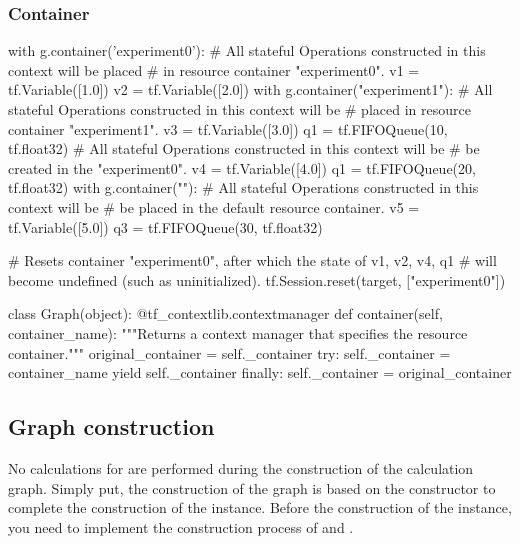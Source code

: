 \begin{content}
\subsubsection{Container}

\begin{leftbar}
\begin{python}
with g.container('experiment0'):
  # All stateful Operations constructed in this context will be placed
  # in resource container "experiment0".
  v1 = tf.Variable([1.0])
  v2 = tf.Variable([2.0])
  with g.container("experiment1"):
    # All stateful Operations constructed in this context will be
    # placed in resource container "experiment1".
    v3 = tf.Variable([3.0])
    q1 = tf.FIFOQueue(10, tf.float32)
  # All stateful Operations constructed in this context will be
  # be created in the "experiment0".
  v4 = tf.Variable([4.0])
  q1 = tf.FIFOQueue(20, tf.float32)
  with g.container(""):
    # All stateful Operations constructed in this context will be
    # be placed in the default resource container.
    v5 = tf.Variable([5.0])
    q3 = tf.FIFOQueue(30, tf.float32)

# Resets container "experiment0", after which the state of v1, v2, v4, q1
# will become undefined (such as uninitialized).
tf.Session.reset(target, ["experiment0"])
\end{python}
\end{leftbar}

\begin{leftbar}
\begin{python}
class Graph(object):
  @tf_contextlib.contextmanager
  def container(self, container_name):
    """Returns a context manager that specifies the resource container."""
    original_container = self._container
    try:
      self._container = container_name
      yield self._container
    finally:
      self._container = original_container
\end{python}
\end{leftbar}


\subsection{Graph construction}
No calculations for  are performed during the construction of the calculation graph. Simply put, the construction of the graph is based on the  constructor to complete the construction of the  instance. Before the construction of the  instance, you need to implement the construction process of  and .



\end{content}
